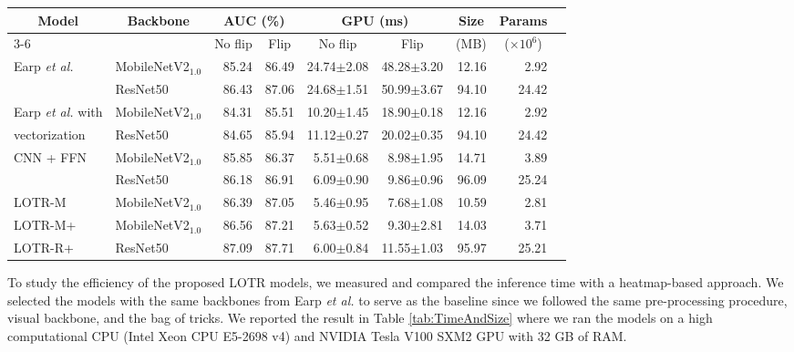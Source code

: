 \documentclass[journal]{IEEEtran}
\begin{document}
\begin{table*}
\caption{Comparison of prediction accuracy, inference time, and model size.}
\centering
\begin{tabular}{llrrrrrrr}
\hline
\multicolumn{1}{c}{Model} &
\multicolumn{1}{c}{Backbone} &
\multicolumn{2}{c}{AUC (\%)} &
\multicolumn{2}{c}{GPU (ms)} &
\multicolumn{1}{c}{Size} &
\multicolumn{1}{c}{Params} \\
\cline{3-6}
& 
&
\multicolumn{1}{c}{No flip} &
\multicolumn{1}{c}{Flip} &
\multicolumn{1}{c}{No flip} &
\multicolumn{1}{c}{Flip} &
\multicolumn{1}{c}{(MB)} &
\multicolumn{1}{c}{($\times10^6$)}\\
\hline
Earp \textit{et al.} \cite{earp2021sub}   & MobileNetV2$_{1.0}$ & 85.24 & 86.49 & 24.74$\pm$2.08 & 48.28$\pm$3.20 & 12.16 &  2.92  \\
                     & ResNet50          & 86.43 & 87.06 & 24.68$\pm$1.51 & 50.99$\pm$3.67 & 94.10 & 24.42 \\  
\hline
Earp \textit{et al.} \cite{earp2021sub} with   & MobileNetV2$_{1.0}$ & 84.31 & 85.51 & 10.20$\pm$1.45 & 18.90$\pm$0.18 & 12.16 & 2.92  \\
vectorization  & ResNet50          & 84.65 & 85.94 & 11.12$\pm$0.27 & 20.02$\pm$0.35 & 94.10 & 24.42  \\  
\hline  
CNN + FFN & MobileNetV2$_{1.0}$ & 85.85 & 86.37 & 5.51$\pm$0.68 & 8.98$\pm$1.95 & 14.71 & 3.89 \\
    & ResNet50            & 86.18 & 86.91 & 6.09$\pm$0.90 & 9.86$\pm$0.96 & 96.09 & 25.24  \\
\hline  
LOTR-M & MobileNetV2$_{1.0}$  & 86.39 & 87.05 & 5.46$\pm$0.95 & 7.68$\pm$1.08  & 10.59 &  2.81 \\  
LOTR-M+ & MobileNetV2$_{1.0}$ & 86.56 & 87.21 & 5.63$\pm$0.52 & 9.30$\pm$2.81  & 14.03 &  3.71 \\ 
LOTR-R+ & ResNet50          & 87.09 & 87.71 & 6.00$\pm$0.84 & 11.55$\pm$1.03 & 95.97 & 25.21 \\ 
\hline
\end{tabular}
\par
\label{tab:TimeAndSize}
\end{table*}


To study the efficiency of the proposed LOTR models, we measured and compared the inference time with a heatmap-based approach. 
We selected the models with the same backbones from Earp \textit{et al.} \cite{earp2021sub} to serve as the baseline since we followed the same pre-processing procedure, visual backbone, and the bag of tricks.
We reported the result in Table \ref{tab:TimeAndSize} where we ran the models on a high computational CPU (Intel Xeon CPU E5-2698 v4) and NVIDIA Tesla V100 SXM2 GPU with 32 GB of RAM.
\end{document}
